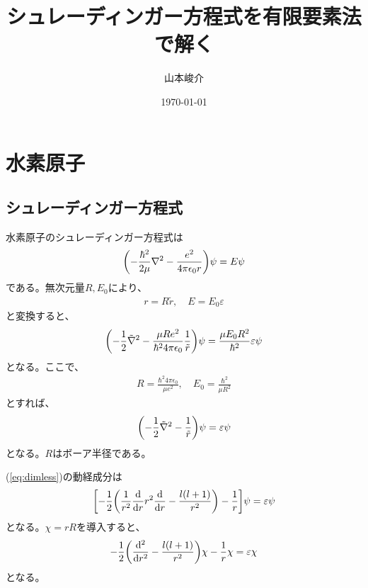 \documentclass[xelatex,ja=standard]{bxjsarticle}
\title{シュレーディンガー方程式を有限要素法で解く}
\author{山本峻介}
\date{\today}
\begin{document}
\maketitle

\section{水素原子}
\subsection{シュレーディンガー方程式}
水素原子のシュレーディンガー方程式は
\begin{align}
    \qty(-\frac{\hbar^2}{2\mu}\nabla^2 -\frac{e^2}{4\pi\epsilon_0 r})\psi = E\psi
\end{align}
である。無次元量$R, E_0$により、
\begin{align}
    r = R\tilde{r},\quad E = E_0\varepsilon
\end{align}
と変換すると、
\begin{align}
    \qty(-\frac{1}{2}\tilde\nabla^2 - \frac{\mu R e^2}{\hbar^2 4\pi\epsilon_0}\frac{1}{\tilde r})\psi = \frac{\mu E_0R^2}{\hbar^2}\varepsilon\psi
\end{align}
となる。ここで、
\begin{align}
    R = \frac{\hbar^2 4\pi\epsilon_0}{\mu e^2}, \quad E_0 = \frac{\hbar^2}{\mu R^2}
\end{align}
とすれば、
\begin{align}
    \qty(-\frac{1}{2}\tilde\nabla^2 - \frac{1}{\tilde r})\psi = \varepsilon\psi\label{eq:dimless}
\end{align}
となる。$R$はボーア半径である。

(\ref{eq:dimless})の動経成分は
\begin{align}
    \qty[-\frac{1}{2}\qty(\frac{1}{r^2}\dv{r}r^2\dv{r} - \frac{l(l+1)}{r^2})
     - \frac{1}{r}]\psi = \varepsilon\psi
\end{align}
となる。$\chi = rR$を導入すると、
\begin{align}
    -\frac{1}{2}\qty(\dv[2]{r} - \frac{l(l+1)}{r^2})\chi - \frac{1}{r}\chi = \varepsilon\chi
\end{align}
となる。 
\end{document}
